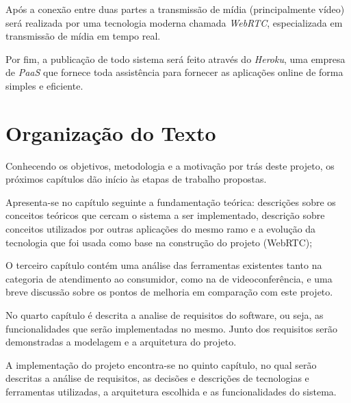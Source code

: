 Após a conexão entre duas partes a transmissão de mídia (principalmente vídeo) será realizada por uma tecnologia moderna chamada \textit{WebRTC}, especializada em transmissão de mídia em tempo real. 

Por fim, a publicação de todo sistema será feito através do \textit{Heroku}, uma empresa de \textit{PaaS} que fornece toda assistência para fornecer as aplicações online de forma simples e eficiente.

\section{Organização do Texto}
Conhecendo os objetivos, metodologia e a motivação por trás deste projeto, os próximos capítulos dão início às etapas de trabalho propostas.

Apresenta-se no capítulo seguinte a fundamentação teórica: descrições sobre os conceitos teóricos que cercam o sistema a ser implementado, descrição sobre conceitos utilizados por outras aplicações do mesmo ramo e a evolução da tecnologia que foi usada como base na construção do projeto (WebRTC); 

O terceiro capítulo contém uma análise das ferramentas existentes tanto na categoria de atendimento ao consumidor, como na de videoconferência, e uma breve discussão sobre os pontos de melhoria em comparação com este projeto.

No quarto capítulo é descrita a analise de requisitos do software, ou seja, as funcionalidades que serão implementadas no mesmo. Junto dos requisitos serão demonstradas a modelagem e a arquitetura do projeto.

A implementação do projeto encontra-se no quinto capítulo, no qual serão descritas a análise de requisitos, as decisões e descrições de tecnologias e ferramentas utilizadas, a arquitetura escolhida e as funcionalidades do sistema.
